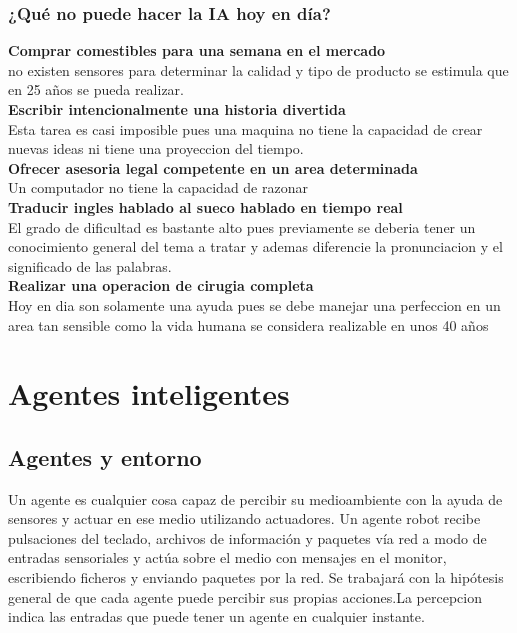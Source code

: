 \documentclass[12pt,a4paper]{report}
\begin{document}
\subsection*{¿Qué no puede hacer la IA hoy en día?}
\textbf{Comprar comestibles para una semana en el mercado}\\no existen sensores para determinar la calidad y tipo de producto se estimula que en 25 años se pueda realizar.\\\textbf{Escribir intencionalmente una historia divertida}\\Esta tarea es casi imposible pues una maquina no tiene la capacidad de crear nuevas ideas ni tiene una proyeccion del tiempo.\\\textbf{Ofrecer asesoria legal competente en un area determinada}\\Un computador no tiene la capacidad de razonar\\\textbf{Traducir ingles hablado al sueco hablado en tiempo real}\\El grado de dificultad es bastante alto pues previamente se deberia tener un conocimiento general del tema a tratar y ademas diferencie la pronunciacion y el significado de las palabras.\\\textbf{Realizar una operacion de cirugia completa}\\Hoy en dia son solamente una ayuda pues se debe manejar una perfeccion en un area tan sensible como la vida humana se considera realizable en unos 40 años
\chapter{Agentes inteligentes}
\section{Agentes y entorno} Un agente es cualquier cosa capaz de percibir su medioambiente con la ayuda de sensores y actuar en ese medio utilizando actuadores. Un agente robot recibe pulsaciones del teclado, archivos de información y paquetes vía red a modo de entradas sensoriales y actúa sobre el medio con mensajes en el monitor, escribiendo ficheros y enviando paquetes por la red. Se trabajará con la hipótesis general de que cada agente puede percibir sus propias acciones.La percepcion indica las entradas que puede tener un agente en cualquier instante.
\end{document}
